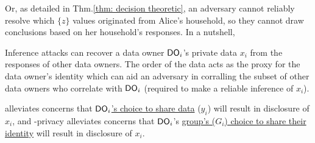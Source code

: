 Or, as detailed in Thm.\ref{thm: decision theoretic}, an adversary cannot reliably resolve which $\{z\}$ values originated from Alice's household, so they cannot draw conclusions based on her household's responses. 
In a nutshell,    \squishlistfour   
    \item Inference attacks can recover a data owner $\textsf{DO}_i$'s private data $x_i$ from the responses of other data owners. The order of the data acts as the proxy for the data owner's identity which can aid an adversary in corralling the subset of other data owners who correlate with $\textsf{DO}_i$ (required to make a reliable inference of $x_i$). 
    \item  \DP alleviates concerns that \underline{$\textsf{DO}_i$'s choice to share data} ($y_i$) will result in disclosure of $x_i$, and \name-privacy alleviates concerns that $\textsf{DO}_i$'s \underline{group's ($G_i$) choice to share their identity} will result in disclosure of $x_i$.
    \vspace{-0.2cm}
\squishendfour
   \vspace{-0.3cm}%




